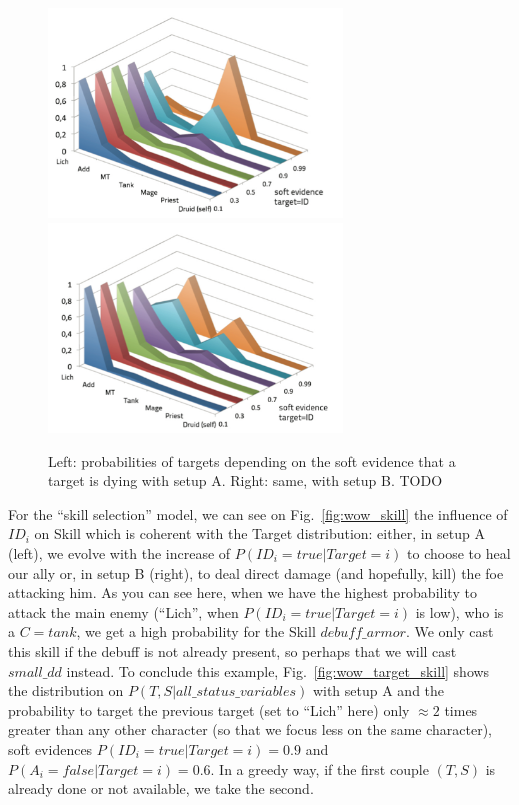 \begin{figure}[h!]
\begin{center}
\includegraphics[width=7.8cm]{images/wow_distrib_target1.png} \includegraphics[width=7.8cm]{images/wow_distrib_target2.png}
\caption{Left: probabilities of targets depending on the soft evidence that a target is dying with setup A. Right: same, with setup B. TODO }
\label{fig:wow_target}
\end{center}
\end{figure}

For the ``skill selection'' model, we can see on Fig.~\ref{fig:wow_skill} the influence of $ID_i$ on Skill which is coherent with the Target distribution: either, in setup A (left), we evolve with the increase of $P(ID_i=true|Target=i)$ to choose to heal our ally or, in setup B (right), to deal direct damage (and hopefully, kill) the foe attacking him. As you can see here, when we have the highest probability to attack the main enemy (``Lich'', when $P(ID_i=true|Target=i)$ is low), who is a $C=tank$, we get a high probability for the Skill $debuff\_armor$. We only cast this skill if the debuff is not already present, so perhaps that we will cast $small\_dd$ instead. To conclude this example, Fig.~\ref{fig:wow_target_skill} shows the distribution on $P(T,S|all\_status\_variables)$ with setup A and the probability to target the previous target (set to ``Lich'' here) only $\approx 2$ times greater than any other character (so that we focus less on the same character), soft evidences $P(ID_i=true|Target=i)=0.9$ and $P(A_i=false|Target=i)=0.6$. In a greedy way, if the first couple $(T,S)$ is already done or not available, we take the second.

